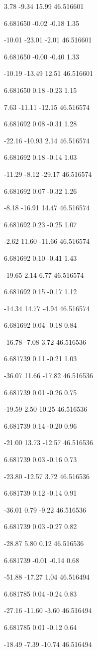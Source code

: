 3.78
-9.34
15.99
46.516601

6.681650
-0.02
-0.18
1.35

-10.01
-23.01
-2.01
46.516601

6.681650
-0.00
-0.40
1.33

-10.19
-13.49
12.51
46.516601

6.681650
0.18
-0.23
1.15

7.63
-11.11
-12.15
46.516574

6.681692
0.08
-0.31
1.28

-22.16
-10.93
2.14
46.516574

6.681692
0.18
-0.14
1.03

-11.29
-8.12
-29.17
46.516574

6.681692
0.07
-0.32
1.26

-8.18
-16.91
14.47
46.516574

6.681692
0.23
-0.25
1.07

-2.62
11.60
-11.66
46.516574

6.681692
0.10
-0.41
1.43

-19.65
2.14
6.77
46.516574

6.681692
0.15
-0.17
1.12

-14.34
14.77
-4.94
46.516574

6.681692
0.04
-0.18
0.84

-16.78
-7.08
3.72
46.516536

6.681739
0.11
-0.21
1.03

-36.07
11.66
-17.82
46.516536

6.681739
0.01
-0.26
0.75

-19.59
2.50
10.25
46.516536

6.681739
0.14
-0.20
0.96

-21.00
13.73
-12.57
46.516536

6.681739
0.03
-0.16
0.73

-23.80
-12.57
3.72
46.516536

6.681739
0.12
-0.14
0.91

-36.01
0.79
-9.22
46.516536

6.681739
0.03
-0.27
0.82

-28.87
5.80
0.12
46.516536

6.681739
-0.01
-0.14
0.68

-51.88
-17.27
1.04
46.516494

6.681785
0.04
-0.24
0.83

-27.16
-11.60
-3.60
46.516494

6.681785
0.01
-0.12
0.64

-18.49
-7.39
-10.74
46.516494

